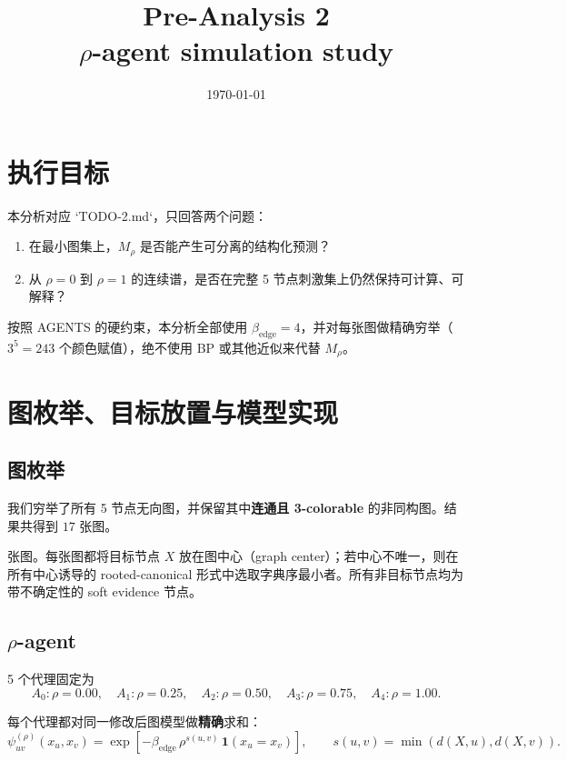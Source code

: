 \documentclass[11pt,a4paper]{ctexart}
\title{Pre-Analysis 2\\[4pt]
\large \texorpdfstring{$\rho$}{rho}-agent simulation study}
\author{}
\date{\today}
\begin{document}
\maketitle

\tableofcontents
\bigskip

\section{执行目标}

本分析对应 `TODO-2.md`，只回答两个问题：
\begin{enumerate}
    \item 在最小图集上，$M_\rho$ 是否能产生可分离的结构化预测？
    \item 从 $\rho=0$ 到 $\rho=1$ 的连续谱，是否在完整 5 节点刺激集上仍然保持可计算、可解释？
\end{enumerate}

按照 AGENTS 的硬约束，本分析全部使用 $\beta_{\mathrm{edge}}=4$，并对每张图做精确穷举（$3^5=243$ 个颜色赋值），绝不使用 BP 或其他近似来代替 $M_\rho$。

\section{图枚举、目标放置与模型实现}

\subsection{图枚举}

我们穷举了所有 5 节点无向图，并保留其中\textbf{连通且 3-colorable} 的非同构图。结果共得到 $17$ 张图。

张图。每张图都将目标节点 $X$ 放在图中心（graph center）；若中心不唯一，则在所有中心诱导的 rooted-canonical 形式中选取字典序最小者。所有非目标节点均为带不确定性的 soft evidence 节点。

\subsection{\texorpdfstring{$\rho$}{rho}-agent}

5 个代理固定为
\[
A_0: \rho=0.00,\quad
A_1: \rho=0.25,\quad
A_2: \rho=0.50,\quad
A_3: \rho=0.75,\quad
A_4: \rho=1.00.
\]

每个代理都对同一修改后图模型做\textbf{精确}求和：
\[
\psi^{(\rho)}_{uv}(x_u,x_v)
=
\exp\!\left[-\beta_{\mathrm{edge}}\,\rho^{s(u,v)}\,\mathbf{1}(x_u=x_v)\right],
\qquad
s(u,v)=\min(d(X,u),d(X,v)).
\]
\end{document}
